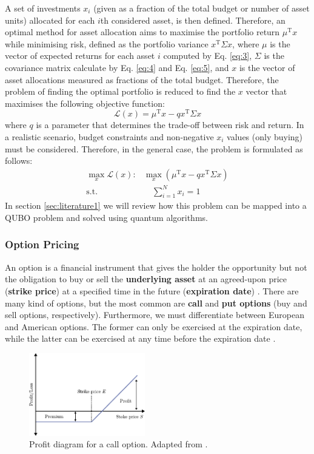 \documentclass[prx,twocolumn,floatfix,superscriptaddress,longbibliography]{revtex4-1}
\begin{document}
A set of investments $x_i$ (given as a fraction of the total budget or number of asset units) allocated for each $i$th considered asset, 
is then defined. Therefore, an optimal method for asset allocation aims to maximise the portfolio return 
$\mu^\text{T} x$ while minimising risk, defined as the portfolio variance $x^\text{T}\Sigma x$, where $\mu$ is the vector of expected returns for each asset $i$ computed by Eq. \ref{eq:3}, $\Sigma$ is the covariance matrix calculate by Eq. \ref{eq:4} and Eq. \ref{eq:5}, and $x$ is the vector 
of asset allocations measured as fractions of the total budget. Therefore, the problem of finding the optimal portfolio is reduced to find the $x$ vector that maximises the following objective function: 
\begin{equation}
  \label{eq:6}
  \mathcal{L}(x) = \mu^\text{T} x - q x^\text{T}\Sigma x
\end{equation}
where $q$ is a parameter that determines the trade-off between risk and return.  In a realistic scenario, budget constraints and non-negative 
$x_i$ values (only buying) must be considered. Therefore, in the general case, the problem is formulated as follows:
\begin{equation}
\begin{aligned}
  \label{eq:7}
  \max_{x} \mathcal{L}(x): & \max_{x}\left(\mu^\text{T} x - q x^\text{T}\Sigma x \right) \\ 
  \text{s.t.} & \quad \sum_{i=1}^{N} x_i = 1 
\end{aligned}
\end{equation}
In section \ref{sec:literature1} we will review how this problem can be mapped into a QUBO problem and solved using quantum algorithms.

\subsubsection{Option Pricing}
An option is a financial instrument that gives the holder the opportunity but not the obligation to buy or sell the  \textbf{underlying asset} at an agreed-upon price (\textbf{strike price}) at a specified time in the future (\textbf{expiration date}) \cite{Wilmott2007}. There are many kind of options, 
but the most common are \textbf{call} and \textbf{put options} (buy and sell options, respectively). Furthermore, we must 
differentiate between European and American options. The former can only be exercised at the expiration date, while the latter can be exercised at any time before the expiration date \cite{Rebentrost2018}. 
\begin{figure}
\centering
\includegraphics[width=0.45\textwidth]{pay-off.pdf}
  \caption{\label{fig:profit-diagram} Profit diagram for a call option. Adapted from \cite{Wilmott2007}.}
\end{figure}
\end{document}
